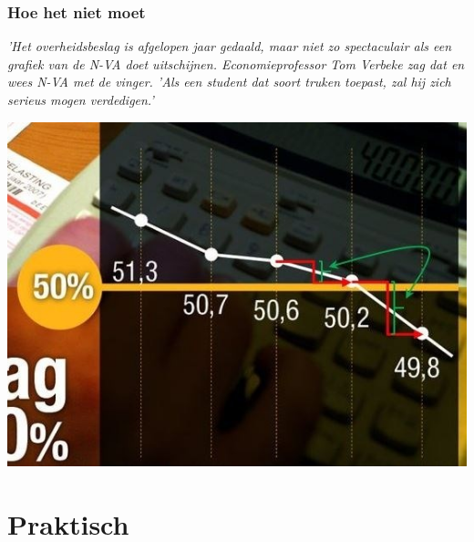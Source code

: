 \documentclass[aspectratio=169]{beamer}
\begin{document}
\begin{frame}
  \frametitle{Hoe het niet moet}
  {\tiny \textit{'Het overheidsbeslag is afgelopen jaar gedaald, maar niet zo spectaculair als een grafiek van de N-VA doet uitschijnen. Economieprofessor Tom Verbeke zag dat en wees N-VA met de vinger. 'Als een student dat soort truken toepast, zal hij zich serieus mogen verdedigen.'} }
  
  \centering
  \includegraphics[height=.7\textheight]{img/intro-nva.jpg}
\end{frame}

\section{Praktisch}
\end{document}
